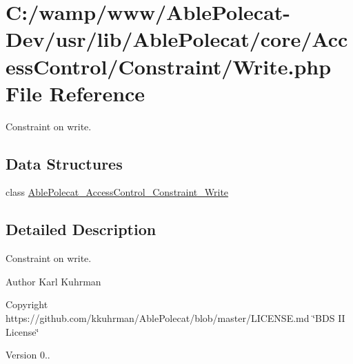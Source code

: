 \hypertarget{_write_8php}{}\section{C\+:/wamp/www/\+Able\+Polecat-\/\+Dev/usr/lib/\+Able\+Polecat/core/\+Access\+Control/\+Constraint/\+Write.php File Reference}
\label{_write_8php}


Constraint on write.  


\subsection*{Data Structures}
\begin{DoxyCompactItemize}
\item 
class \hyperlink{class_able_polecat___access_control___constraint___write}{Able\+Polecat\+\_\+\+Access\+Control\+\_\+\+Constraint\+\_\+\+Write}
\end{DoxyCompactItemize}


\subsection{Detailed Description}
Constraint on write. 

\begin{DoxyAuthor}{Author}
Karl Kuhrman 
\end{DoxyAuthor}
\begin{DoxyCopyright}{Copyright}
https\+://github.com/kkuhrman/\+Able\+Polecat/blob/master/\+L\+I\+C\+E\+N\+S\+E.\+md \char`\"{}\+B\+D\+S I\+I License\char`\"{} 
\end{DoxyCopyright}
\begin{DoxyVersion}{Version}
0.. 
\end{DoxyVersion}
